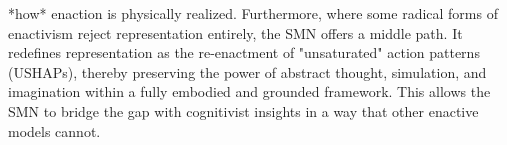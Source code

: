 *how* enaction is physically realized. Furthermore, where some radical forms of enactivism reject representation entirely, the SMN offers a middle path. It redefines representation as the re-enactment of "unsaturated" action patterns (USHAPs), thereby preserving the power of abstract thought, simulation, and imagination within a fully embodied and grounded framework. This allows the SMN to bridge the gap with cognitivist insights in a way that other enactive models cannot.
